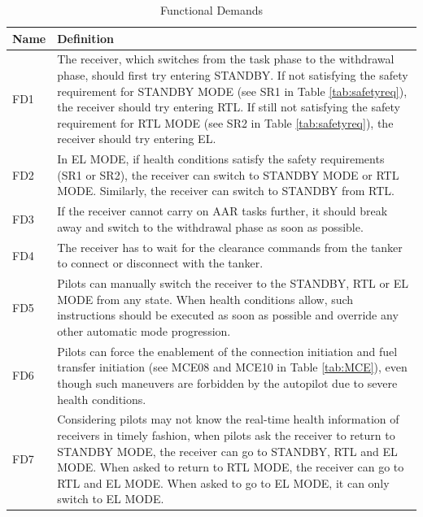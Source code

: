 \begin{table}
	\caption{Functional Demands \label{tab:functiondemand}}
	{\begin{tabular}{@{}lp{15cm}@{}}
			\hline \hline
			Name & Definition \\
			\hline \hline
			FD1 & The receiver, which switches from the task phase to the withdrawal phase, should first try entering STANDBY. If not satisfying the safety requirement for STANDBY MODE (see SR1 in Table \ref{tab:safetyreq}), the receiver should try entering RTL. If still not satisfying the safety requirement for RTL MODE (see SR2 in Table \ref{tab:safetyreq}), the receiver should try entering EL.  \\ 
			FD2 & In EL MODE, if health conditions satisfy the safety requirements (SR1 or SR2), the receiver can switch to STANDBY MODE or RTL MODE. Similarly, the receiver can switch to STANDBY from RTL. \\ 
			FD3 & If the receiver cannot carry on AAR tasks further, it should break away and switch to the withdrawal phase as soon as possible. \\ 
			FD4 & The receiver has to wait for the clearance commands from the tanker to connect or disconnect with the tanker. \\ 
			FD5 & Pilots can manually switch the receiver to the STANDBY, RTL  or EL MODE from any state. When health conditions allow, such instructions should be executed as soon as possible and override any other automatic mode progression. \\ 
			FD6 & Pilots can force the enablement of the connection initiation and fuel transfer initiation (see MCE08 and MCE10 in Table \ref{tab:MCE}), even though such maneuvers are forbidden by the autopilot due to severe health conditions. \\ 
			FD7 & Considering pilots may not know the real-time health information of receivers in timely fashion, when pilots ask the receiver to return to STANDBY MODE, the receiver can go to STANDBY, RTL and EL MODE. When asked to return to RTL MODE, the receiver can go to RTL and EL MODE. When asked to go to EL MODE, it can only switch to EL MODE. \\
			\hline \hline
	\end{tabular}}
\end{table}

~\\[5cm]

